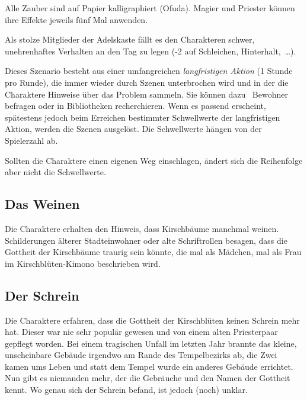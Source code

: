 {		\noindent
		Alle Zauber sind auf Papier kalligraphiert (Ofuda). Magier und Priester können ihre Effekte jeweils fünf Mal anwenden.

		Als stolze Mitglieder der Adelskaste fällt es den Charakteren schwer, unehrenhaftes Verhalten an den Tag zu legen (-2 auf Schleichen, Hinterhalt,~\ldots).


		\noindent
		Dieses Szenario besteht aus einer umfangreichen \emph{langfristigen Aktion} (1 Stunde pro Runde), die immer wieder durch Szenen unterbrochen wird und in der die Charaktere Hinweise über das Problem sammeln. Sie können dazu \zB\ Bewohner befragen oder in Bibliotheken recherchieren. Wenn es passend erscheint, spätestens jedoch beim Erreichen bestimmter Schwellwerte der langfristigen Aktion, werden die Szenen ausgelöst. Die Schwellwerte hängen von der Spielerzahl ab.


		\noindent
		Sollten die Charaktere einen eigenen Weg einschlagen, ändert sich die Reihenfolge aber nicht die Schwellwerte.

		\subsection{Das Weinen}

			Die Charaktere erhalten den Hinweis, dass Kirschbäume manchmal weinen. Schilderungen älterer Stadteinwohner oder alte Schriftrollen besagen, dass die Gottheit der Kirschbäume traurig sein könnte, die mal als Mädchen, mal als Frau im Kirschblüten-Kimono beschrieben wird.

		\subsection{Der Schrein}

			Die Charaktere erfahren, dass die Gottheit der Kirschblüten keinen Schrein mehr hat. Dieser war nie sehr populär gewesen und von einem alten Priesterpaar gepflegt worden. Bei einem tragischen Unfall im letzten Jahr brannte das kleine, unscheinbare Gebäude irgendwo am Rande des Tempelbezirks ab, die Zwei kamen ums Leben und statt dem Tempel wurde ein anderes Gebäude errichtet. Nun gibt es niemanden mehr, der die Gebräuche und den Namen der Gottheit kennt. Wo genau sich der Schrein befand, ist jedoch (noch) unklar.

}
